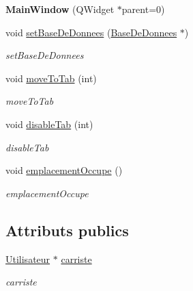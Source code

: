 \begin{DoxyCompactItemize}
\item 
\mbox{\label{class_main_window_a8b244be8b7b7db1b08de2a2acb9409db}} 
{\bfseries Main\+Window} (Q\+Widget $\ast$parent=0)
\item 
\mbox{\label{class_main_window_a819bd562262c9bc43627a54b6748c0c4}} 
void \mbox{\hyperlink{class_main_window_a819bd562262c9bc43627a54b6748c0c4}{set\+Base\+De\+Donnees}} (\mbox{\hyperlink{class_base_de_donnees}{Base\+De\+Donnees}} $\ast$)
\begin{DoxyCompactList}\small\item\em set\+Base\+De\+Donnees \end{DoxyCompactList}\item 
\mbox{\label{class_main_window_ad98be47de90e967d8b5a51b4815f4c94}} 
void \mbox{\hyperlink{class_main_window_ad98be47de90e967d8b5a51b4815f4c94}{move\+To\+Tab}} (int)
\begin{DoxyCompactList}\small\item\em move\+To\+Tab \end{DoxyCompactList}\item 
\mbox{\label{class_main_window_acab91acedfd3b1960f1b1ece3cf22e56}} 
void \mbox{\hyperlink{class_main_window_acab91acedfd3b1960f1b1ece3cf22e56}{disable\+Tab}} (int)
\begin{DoxyCompactList}\small\item\em disable\+Tab \end{DoxyCompactList}\item 
\mbox{\label{class_main_window_ab8fa5a39e7f05994836571a2608ff852}} 
void \mbox{\hyperlink{class_main_window_ab8fa5a39e7f05994836571a2608ff852}{emplacement\+Occupe}} ()
\begin{DoxyCompactList}\small\item\em emplacement\+Occupe \end{DoxyCompactList}\end{DoxyCompactItemize}
\subsection*{Attributs publics}
\begin{DoxyCompactItemize}
\item 
\mbox{\label{class_main_window_afcb22251b55d008d21b1889bab07863d}} 
\mbox{\hyperlink{class_utilisateur}{Utilisateur}} $\ast$ \mbox{\hyperlink{class_main_window_afcb22251b55d008d21b1889bab07863d}{carriste}}
\begin{DoxyCompactList}\small\item\em carriste \end{DoxyCompactList}\end{DoxyCompactItemize}


